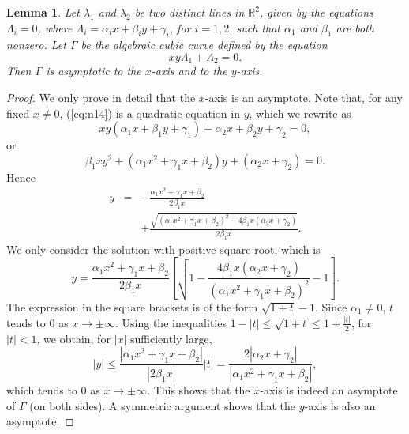 \documentclass[12pt]{article}
\def\reals{{\mathbb R}}
\newtheorem{lemma}[theorem]{Lemma}
\begin{document}
\begin{lemma} \label{lem:as_n}
Let $\lambda_1$ and $\lambda_2$ be two distinct lines in $\reals^2$,
given by the equations $\Lambda_i = 0$, where
$\Lambda_i = \alpha_i x + \beta_i y + \gamma_i$, for $i = 1,2$,
such that $\alpha_1$ and $\beta_1$ are both nonzero.
Let $\Gamma$ be the algebraic cubic curve defined by the equation
\begin{equation} \label{eq:n14}
xy\Lambda_1 + \Lambda_2 = 0.
\end{equation}
Then $\Gamma$ is asymptotic to the $x$-axis and to the $y$-axis.
\end{lemma}
\begin{proof}
We only prove in detail that the $x$-axis is an asymptote. Note
that, for any fixed $x \ne 0$, (\ref{eq:n14}) is a quadratic
equation in $y$, which we rewrite as
\[
xy(\alpha_1 x + \beta_1 y + \gamma_1)
	+ \alpha_2 x + \beta_2 y + \gamma_2 = 0,
\]
or
\[
\beta_1 xy^2 + (\alpha_1 x^2 + \gamma_1 x + \beta_2)y
	+ (\alpha_2 x + \gamma_2) = 0.
\]
Hence
\begin{eqnarray*}
y & = & - \frac{\alpha_1 x^2 + \gamma_1 x + \beta_2}{2\beta_1 x} \\
  &   & \pm \frac{\sqrt{(\alpha_1 x^2 + \gamma_1 x + \beta_2)^2
		  		    - 4\beta_1 x(\alpha_2 x + \gamma_2)}}
		 {2\beta_1 x}.
\end{eqnarray*}
We only consider the solution with positive square root, which is
\[
y = \frac{\alpha_1 x^2 + \gamma_1 x + \beta_2}{2\beta_1 x}
	\left[
		\sqrt{1 - \frac{4\beta_1 x(\alpha_2 x + \gamma_2)}
					   {(\alpha_1 x^2 + \gamma_1 x + \beta_2)^2}}
		- 1
	\right].
\]
The expression in the square brackets is of the form
$\sqrt{1+t}-1$. Since $\alpha_1 \ne 0$, $t$ tends to 0 as $x \to
\pm \infty$. Using the inequalities
$1 - |t| \le \sqrt{1+t} \le 1 + \frac{|t|}{2}$,
for $|t| < 1$, we obtain, for $|x|$ sufficiently large,
\[
|y| \le \frac{|\alpha_1 x^2 + \gamma_1 x + \beta_2|}{|2\beta_1 x|}|t|
	= \frac{2|\alpha_2 x + \gamma_2|}{|\alpha_1 x^2 + \gamma_1 x + \beta_2|},
\]
which tends to 0 as $x \to \pm \infty$. This shows that the
$x$-axis is indeed an asymptote of $\Gamma$ (on both sides).
A symmetric argument shows that the $y$-axis is also an
asymptote.
\end{proof}
\end{document}
